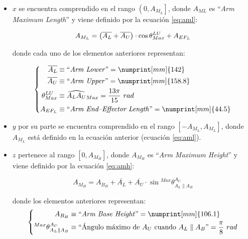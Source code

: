 \begin{itemize}
    \item $x$ se encuentra comprendido en el rango $\left(0, A_{M_L}\right]$, donde $A_{ML}$
    es ``\textit{Arm Maximum Length}'' y viene definido por la ecuación \ref{eq:aml}:

    \begin{equation}\label{eq:aml}
        A_{M_L} = \left(\overline{A_L} + \overline{A_U}\right) \cdot \cos{\theta^{LU}_{Max}} + A_{EF_L}\\
    \end{equation}

    donde cada uno de los elementos anteriores representan:

    \begin{equation*}
        \left\{\begin{aligned}
            \overline{A_L} & \equiv \text{``\textit{Arm Lower}''} = \numprint[mm]{142} \\
            \overline{A_U} & \equiv \text{``\textit{Arm Upper}''} = \numprint[mm]{158.8} \\
            \theta^{LU}_{Max} & \equiv \widehat{A_L A_U}_{Max} = \frac{13\pi}{15}~rad \\
            A_{EF_L} & \equiv \text{``\textit{Arm End--Effector Length}''} = \numprint[mm]{44.5} \\
        \end{aligned}
        \right.
    \end{equation*}

    \item $y$ por su parte se encuentra comprendido en el rango $\left[-A_{M_L}, A_{M_L}\right]$,
    donde $A_{M_L}$ está definido en la ecuación anterior (ecuación \ref{eq:aml}).
    \item $z$ pertenece al rango $\left[0, A_{M_H}\right]$, donde $A_{M_H}$ es 
    ``\textit{Arm Maximum Height}'' y viene definido por la ecuación \ref{eq:amh}:
    
    \begin{equation}\label{eq:amh}
        A_{M_H} = A_{B_H} + \overline{A_L} + \overline{A_U} \cdot \sin{^{Max}\theta^{A_U}_{A_L \parallel A_B}}
    \end{equation}

    donde los elementos anteriores representan:
    \begin{equation*}
        \left\{\begin{aligned}
            A_{B_H} & \equiv \text{``\textit{Arm Base Height}''} = \numprint[mm]{106.1} \\
            ^{Max}\theta^{A_U}_{A_L \parallel A_B} & \equiv \text{``Ángulo máximo de $A_U$ cuando $A_L \parallel A_B$''} = \frac{\pi}{8}~rad \\
        \end{aligned}
        \right.
    \end{equation*}
\end{itemize}

